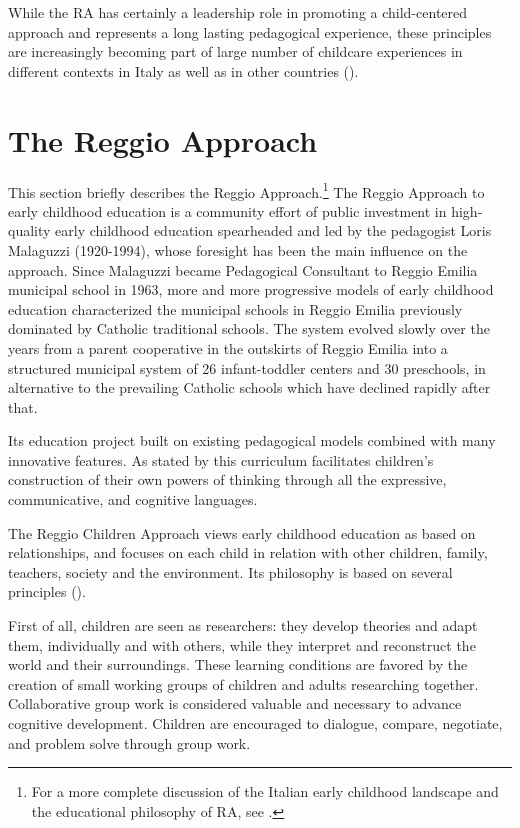 \documentclass[12pt]{article}
\begin{document}
While the RA has certainly a leadership role in promoting a child-centered approach and represents a long lasting pedagogical experience, these principles are increasingly becoming part of large number of childcare experiences in different contexts in Italy as well as in other countries (\cite{Lazzari2012}).

\section{The Reggio Approach} \label{sec:RA}
This section briefly describes the Reggio Approach.\footnote{For a more complete discussion of the Italian early childhood landscape and the educational philosophy of RA, see \citet{Biroli2015}.} The Reggio Approach to early childhood education is a community effort of public investment in high-quality early childhood education spearheaded and led by the pedagogist Loris Malaguzzi (1920-1994), whose foresight has been the main influence on the approach. Since Malaguzzi became Pedagogical Consultant to Reggio Emilia municipal school in 1963, more and more progressive models of early childhood education characterized the municipal schools in Reggio Emilia previously dominated by Catholic traditional schools. The system evolved slowly over the years from a parent cooperative in the outskirts of Reggio Emilia into a structured municipal system of 26 infant-toddler centers and 30 preschools, in alternative to the prevailing Catholic schools which have declined rapidly after that.

Its education project built on existing pedagogical models combined with many innovative features. As stated by \cite{Edwards1993} this curriculum facilitates children's construction of their own powers of thinking through all the expressive, communicative, and cognitive languages.

The Reggio Children Approach views early childhood education as based on relationships, and focuses on each child in relation with other children, family, teachers, society and the environment. Its philosophy is based on several principles (\cite{Rinaldi2005,Gandini1993}).

First of all, children are seen as researchers: they develop theories and adapt them, individually and with others, while they interpret and reconstruct the world and their surroundings. These learning conditions are favored by the creation of small working groups of children and adults researching together. Collaborative group work is considered valuable and necessary to advance cognitive development. Children are encouraged to dialogue, compare, negotiate, and problem solve through group work.
\end{document}
